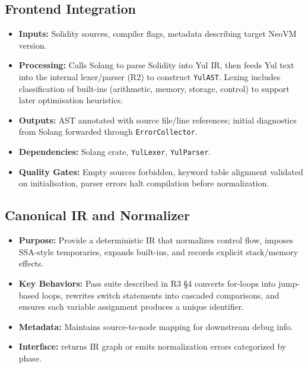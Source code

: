 \documentclass[11pt]{article}
\begin{document}
\subsection{Frontend Integration}
\begin{itemize}
    \item \textbf{Inputs:} Solidity sources, compiler flags, metadata describing target NeoVM version.
    \item \textbf{Processing:} Calls Solang to parse Solidity into Yul IR, then feeds Yul text into the internal lexer/parser (R2) to construct \texttt{YulAST}. Lexing includes classification of built-ins (arithmetic, memory, storage, control) to support later optimisation heuristics.
    \item \textbf{Outputs:} AST annotated with source file/line references; initial diagnostics from Solang forwarded through \texttt{ErrorCollector}.
    \item \textbf{Dependencies:} Solang crate, \texttt{YulLexer}, \texttt{YulParser}.
    \item \textbf{Quality Gates:} Empty sources forbidden, keyword table alignment validated on initialisation, parser errors halt compilation before normalization.
\end{itemize}

\subsection{Canonical IR and Normalizer}
\begin{itemize}
    \item \textbf{Purpose:} Provide a deterministic IR that normalizes control flow, imposes SSA-style temporaries, expands built-ins, and records explicit stack/memory effects.
    \item \textbf{Key Behaviors:} Pass suite described in R3 \S4 converts for-loops into jump-based loops, rewrites switch statements into cascaded comparisons, and ensures each variable assignment produces a unique identifier.
    \item \textbf{Metadata:} Maintains source-to-node mapping for downstream debug info.
    \item \textbf{Interface:}  returns IR graph or emits normalization errors categorized by phase.
\end{itemize}
\end{document}
